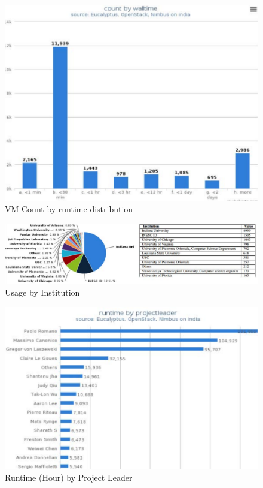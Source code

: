 \documentclass{sig-alternate-05-2015}
\begin{document}
\begin{figure}[h!] 
  \centering 
    \includegraphics[width=1.0\columnwidth]{images/runtime-histogram.pdf} 
  \caption{VM Count by runtime distribution}\label{F:vmcount-2} 
\end{figure} 

\begin{figure}[h!] 
  \centering 
    \includegraphics[width=1.0\columnwidth]{images/group-usage1.pdf} 
  \caption{Usage by Institution}\label{F:group-usage-1} 
\end{figure} 
 
\begin{figure}[h!] 
  \centering 
    \includegraphics[width=1.0\columnwidth]{images/group-usage2.pdf} 
  \caption{Runtime (Hour) by Project Leader}\label{F:group-usage-2} 
\end{figure} 
\end{document}
